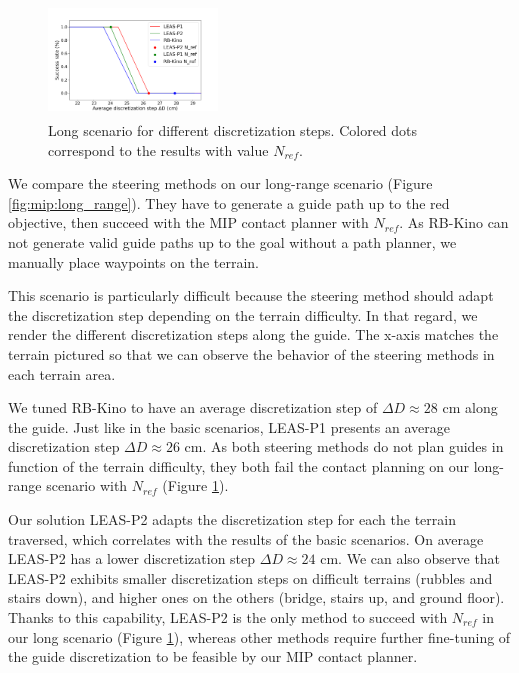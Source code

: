 \begin{figure}[ht]
    \centering
    \includegraphics[trim={0cm 0cm 2cm 1.7cm}, clip,width=0.4\textwidth, height=3cm]{Figures/Chapter_MIP_SL1M/res_mip/MIP_res_long/FIGURE_MIP_LONG_2.png}
    \caption{Long scenario for different discretization steps. Colored dots correspond to the results with value $N_{ref}$.}
    \label{fig:mip:long_range:res}
\end{figure}

We compare the steering methods on our long-range scenario (Figure \ref{fig:mip:long_range}).
They have to generate a guide path up to the red objective, then succeed with the MIP contact planner with $N_{ref}$.
As RB-Kino can not generate valid guide paths up to the goal without a path planner, we manually place waypoints on the terrain.

This scenario is particularly difficult because the steering method should adapt the discretization step depending on the terrain difficulty.
In that regard, we render the different discretization steps along the guide.
The x-axis matches the terrain pictured so that we can observe the behavior of the steering methods in each terrain area.

We tuned RB-Kino to have an average discretization step of $\Delta D \approx 28$ cm along the guide.
Just like in the basic scenarios, LEAS-P1 presents an average discretization step $\Delta D \approx 26$ cm.
As both steering methods do not plan guides in function of the terrain difficulty, they both fail the contact planning on our long-range scenario with $N_{ref}$ (Figure \ref{fig:mip:long_range:res}).

Our solution LEAS-P2 adapts the discretization step for each the terrain traversed, which correlates with the results of the basic scenarios. 
On average LEAS-P2 has a lower discretization step $\Delta D \approx 24$ cm.
We can also observe that LEAS-P2 exhibits smaller discretization steps on difficult terrains (rubbles and stairs down), and higher ones on the others (bridge, stairs up, and ground floor).
Thanks to this capability, LEAS-P2 is the only method to succeed with $N_{ref}$ in our long scenario (Figure \ref{fig:mip:long_range:res}), whereas other methods require further fine-tuning of the guide discretization to be feasible by our MIP contact planner.



